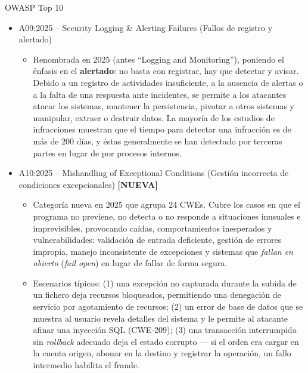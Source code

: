 \documentclass[aspectratio=169,10pt]{beamer}
\begin{document}
\begin{frame}[allowframebreaks]{OWASP Top 10}
\small
  \begin{itemize}
  \item A09:2025 -- Security Logging \& Alerting Failures (Fallos de registro y alertado)
  \begin{itemize}
  \item Renombrada en 2025 (antes ``Logging and Monitoring''), poniendo el énfasis en el \textbf{alertado}: no basta con registrar, hay que detectar y avisar. Debido a un registro de actividades insuficiente, a la ausencia de alertas o a la falta de una respuesta ante incidentes, se permite a los atacantes atacar los sistemas, mantener la persistencia, pivotar a otros sistemas y manipular, extraer o destruir datos. La mayoría de los estudios de infracciones muestran que el tiempo para detectar una infracción es de más de 200 días, y éstas generalmente se han detectado por terceras partes en lugar de por procesos internos.
    \end{itemize}

  \item A10:2025 -- Mishandling of Exceptional Conditions (Gestión incorrecta de condiciones excepcionales) \textbf{[NUEVA]}
  \begin{itemize}
  \item Categoría nueva en 2025 que agrupa 24 CWEs. Cubre los casos en que el programa no previene, no detecta o no responde a situaciones inusuales e imprevisibles, provocando caídas, comportamientos inesperados y vulnerabilidades: validación de entrada deficiente, gestión de errores impropia, manejo inconsistente de excepciones y sistemas que \emph{fallan en abierto} (\emph{fail open}) en lugar de fallar de forma segura.
  \item Escenarios típicos: (1) una excepción no capturada durante la subida de un fichero deja recursos bloqueados, permitiendo una denegación de servicio por agotamiento de recursos; (2) un error de base de datos que se muestra al usuario revela detalles del sistema y le permite al atacante afinar una inyección SQL (CWE-209); (3) una transacción interrumpida sin \emph{rollback} adecuado deja el estado corrupto --- si el orden era cargar en la cuenta origen, abonar en la destino y registrar la operación, un fallo intermedio habilita el fraude.
    \end{itemize}

  \end{itemize}
\end{frame}
\end{document}
